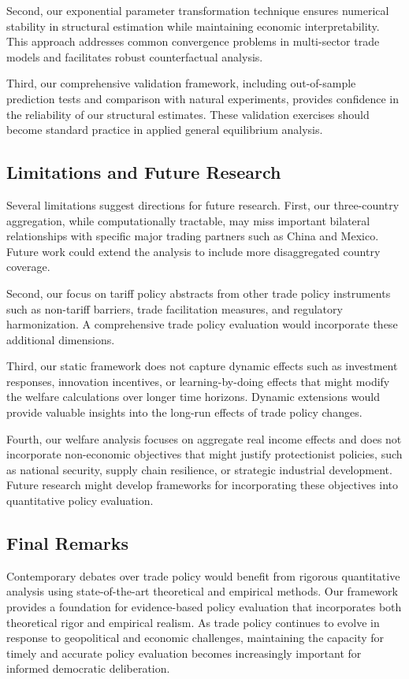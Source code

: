 Second, our exponential parameter transformation technique ensures numerical stability in structural estimation while maintaining economic interpretability. This approach addresses common convergence problems in multi-sector trade models and facilitates robust counterfactual analysis.

Third, our comprehensive validation framework, including out-of-sample prediction tests and comparison with natural experiments, provides confidence in the reliability of our structural estimates. These validation exercises should become standard practice in applied general equilibrium analysis.

\subsection{Limitations and Future Research}

Several limitations suggest directions for future research. First, our three-country aggregation, while computationally tractable, may miss important bilateral relationships with specific major trading partners such as China and Mexico. Future work could extend the analysis to include more disaggregated country coverage.

Second, our focus on tariff policy abstracts from other trade policy instruments such as non-tariff barriers, trade facilitation measures, and regulatory harmonization. A comprehensive trade policy evaluation would incorporate these additional dimensions.

Third, our static framework does not capture dynamic effects such as investment responses, innovation incentives, or learning-by-doing effects that might modify the welfare calculations over longer time horizons. Dynamic extensions would provide valuable insights into the long-run effects of trade policy changes.

Fourth, our welfare analysis focuses on aggregate real income effects and does not incorporate non-economic objectives that might justify protectionist policies, such as national security, supply chain resilience, or strategic industrial development. Future research might develop frameworks for incorporating these objectives into quantitative policy evaluation.

\subsection{Final Remarks}

Contemporary debates over trade policy would benefit from rigorous quantitative analysis using state-of-the-art theoretical and empirical methods. Our framework provides a foundation for evidence-based policy evaluation that incorporates both theoretical rigor and empirical realism. As trade policy continues to evolve in response to geopolitical and economic challenges, maintaining the capacity for timely and accurate policy evaluation becomes increasingly important for informed democratic deliberation.

